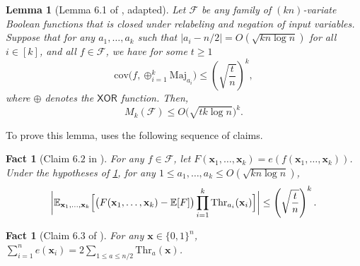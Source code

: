 \documentclass[10pt,a4paper]{article}
\newtheorem{fact}[theorem]{Fact}
\newtheorem{lemma}[theorem]{Lemma}
\theoremstyle{definition}
\begin{document}
\begin{lemma}[Lemma 6.1 of \cite{xorlemma}, adapted]
\label{lem:corrbounds}
Let $\mathcal{F}$ be any family of $(kn)$-variate Boolean functions that is closed under relabeling and negation of input variables.  Suppose that for any $a_1,\ldots,a_k$ such that $\vert a_i-n/2\vert = O(\sqrt{kn \log n})$ for all $i\in [k]$, and all $f\in \mathcal{F}$, we have for some $t\geq 1$
\begin{equation*}
    \mathrm{cov} \bigl(f, \oplus_{i=1}^k \mathrm{Maj}_{a_i} \bigr)
    \leq \left(\sqrt{\frac{t}{n}}\right)^k,
\end{equation*}
%
where $\oplus$ denotes the $\mathsf{XOR}$ function.
Then, 
\begin{equation*}
    M_k(\mathcal{F})\leq O \bigl(\sqrt{tk\log n} \bigr)^k.
\end{equation*}
\end{lemma}
To prove this lemma, \cite{xorlemma} uses the following sequence of claims. 
\begin{fact}[Claim $6.2$ in \cite{xorlemma}] 
\label{fact:f1}
 For any $f\in \mathcal{F}$, let $F(\mathbf{x}_1,\ldots,\mathbf{x}_k)=e(f(\mathbf{x}_1,\ldots,\mathbf{x}_k))$. Under the hypotheses of \cref{lem:corrbounds}, for any $1\leq a_1,\ldots,a_k\leq O(\sqrt{kn\log n})$, 
\begin{equation*}
    \biggl| \mathbb{E}_{\mathbf{x}_1,\ldots,\mathbf{x}_k} \Bigl[ \bigl(F(\mathbf{x}_1,\ldots,\mathbf{x}_k)-\mathbb{E}[F] \bigr) \prod_{i=1}^k \mathrm{Thr}_{a_i}(\mathbf{x}_i) \Bigr] \biggr| \leq \left(\sqrt{\frac{t}{n}}\right)^k.
\end{equation*}
\end{fact}


\begin{fact}[Claim 6.3 of \cite{xorlemma}]
\label{fact:f2}
For any $\mathbf{x}\in \{0,1\}^n$, $\sum_{i=1}^n e(\mathbf{x}_i)=2\sum_{1\leq a\leq n/2} \mathrm{Thr}_a(\mathbf{x})$.
\end{fact}
\end{document}
